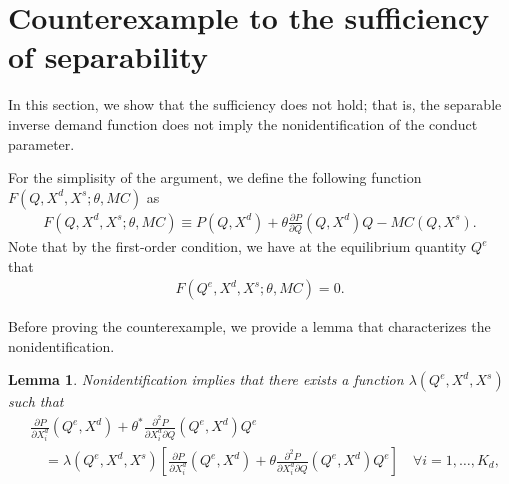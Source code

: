 \documentclass[11pt, a4paper]{article}
\newtheorem{lemma}{Lemma}
\theoremstyle{remark}
\begin{document}
\section{Counterexample to the sufficiency of separability}\label{sec:counterexample_sufficiency}
In this section, we show that the sufficiency does not hold; that is, the separable inverse demand function does not imply the nonidentification of the conduct parameter.


For the simplisity of the argument, we define the following function $F(Q, X^{d}, X^{s}; \theta, MC)$ as
\begin{align}
    F(Q, X^{d}, X^{s}; \theta, MC) \equiv P(Q, X^{d}) + \theta \frac{\partial P}{\partial Q}(Q, X^{d}) Q - MC(Q, X^{s}).
\end{align}
Note that by the first-order condition, we have at the equilibrium quantity $Q^e$ that
\begin{align}
    F(Q^e, X^{d}, X^{s}; \theta, MC) = 0.
\end{align}

Before proving the counterexample, we provide a lemma that characterizes the nonidentification.
\begin{lemma}\label{lemma:nonidentification_transformation}
    Nonidentification implies that there exists a function $\lambda(Q^e, X^{d}, X^{s})$ such that
    \begin{align}
        &\frac{\partial P}{\partial X^{d}_i}(Q^e, X^{d}) + \theta^{*}\frac{\partial^2 P}{\partial X^{d}_{i}\partial Q}(Q^e, X^{d})Q^e \\
        &\quad = \lambda(Q^e, X^{d}, X^{s}) \left[\frac{\partial P}{\partial X^{d}_i}(Q^e, X^{d}) + \theta\frac{\partial^2 P}{\partial X^{d}_{i}\partial Q}(Q^e, X^{d})Q^e \right] \quad \forall i = 1, \ldots, K_d,\label{eq:lambda_foc_demand}
    \end{align}
\end{lemma}
\end{document}
